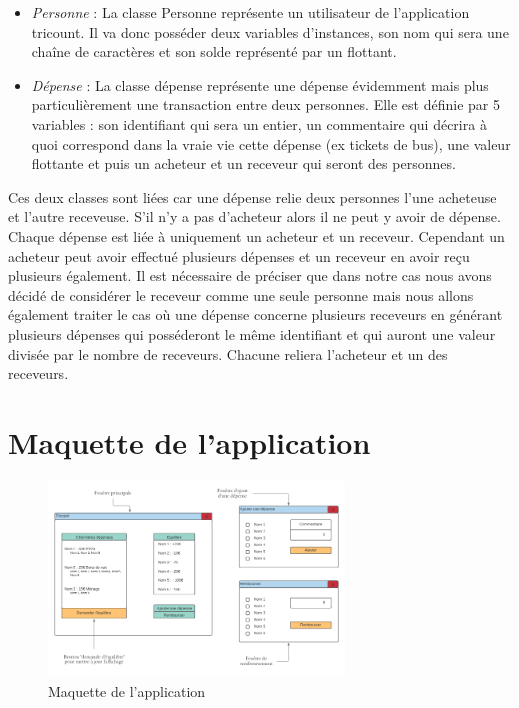 \documentclass[12,french]{report}
\begin{document}
\begin{itemize}[label=\textbullet]
	\item \emph{Personne} :
La classe Personne représente un utilisateur de l’application tricount. Il va donc posséder deux variables d’instances, son nom qui sera une chaîne de caractères et son solde représenté par un flottant.
	\item \emph{Dépense} :
La classe dépense représente une dépense évidemment mais plus particulièrement une transaction entre deux personnes. Elle est définie par 5 variables : son identifiant qui sera un entier, un commentaire qui décrira à quoi correspond dans la vraie vie cette dépense (ex tickets de bus), une valeur flottante et puis un acheteur et un receveur qui seront des personnes.
\end{itemize}\vspace{0.5cm}


Ces deux classes sont liées car une dépense relie deux personnes l’une acheteuse et l’autre receveuse. S’il n’y a pas d’acheteur alors il ne peut y avoir de dépense. Chaque dépense est liée à uniquement un acheteur et un receveur. Cependant un acheteur peut avoir effectué plusieurs dépenses et un receveur en avoir reçu plusieurs également. 
Il est nécessaire de préciser que dans notre cas nous avons décidé de considérer le receveur comme une seule personne mais nous allons également traiter le cas où une dépense concerne plusieurs receveurs en générant plusieurs dépenses qui posséderont le même identifiant et qui auront une valeur divisée par le nombre de receveurs. Chacune reliera l’acheteur et un des receveurs. 

\section{Maquette de l'application}

\begin{figure}[H]
	\center
	\includegraphics[width=0.7\textwidth]{./Images/Maquette}
	\caption{Maquette de l'application}
\end{figure}\vspace{0.2cm}
\end{document}
